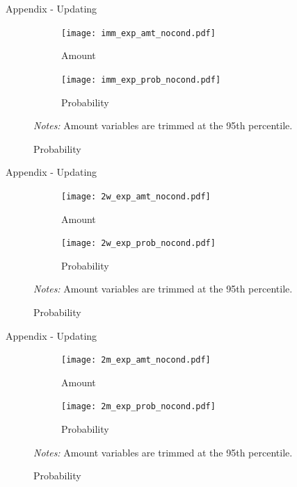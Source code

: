 \documentclass[8pt]{beamer}
\begin{document}
\begin{frame}{Appendix - Updating}
    \begin{figure}[H]
    \caption{Immediate updating}
    \label{update_expimm}
    \begin{center}
        \begin{subfigure}{0.45\textwidth}
            \caption{Amount}
            \centering
            \texttt{[image: imm\_exp\_amt\_nocond.pdf]}
        \end{subfigure}
        \begin{subfigure}{0.45\textwidth}
            \caption{Probability}
                \centering
                \texttt{[image: imm\_exp\_prob\_nocond.pdf]}
        \end{subfigure}
    \end{center} 
         \scriptsize \textit{Notes:} Amount variables are trimmed at the 95th percentile.
\end{figure}
\end{frame}

\begin{frame}{Appendix - Updating}
        \begin{figure}[H]
    \caption{Updating at 2 weeks}
    \label{update_exp2w}
    \begin{center}
        \begin{subfigure}{0.45\textwidth}
            \caption{Amount}
            \centering
            \texttt{[image: 2w\_exp\_amt\_nocond.pdf]}
        \end{subfigure}
        \begin{subfigure}{0.45\textwidth}
            \caption{Probability}
            \centering
            \texttt{[image: 2w\_exp\_prob\_nocond.pdf]}
        \end{subfigure}
      \end{center} 
         \scriptsize \textit{Notes:} Amount variables are trimmed at the 95th percentile.
\end{figure}      
        
\end{frame}


\begin{frame}{Appendix - Updating}
    \begin{figure}[H]
    \caption{Updating at 2 months}
    \label{update_exp2m}
    \begin{center}
            \begin{subfigure}{0.45\textwidth}
            \caption{Amount}
            \centering
            \texttt{[image: 2m\_exp\_amt\_nocond.pdf]}
        \end{subfigure}
        \begin{subfigure}{0.45\textwidth}
            \caption{Probability}
            \centering
            \texttt{[image: 2m\_exp\_prob\_nocond.pdf]}
        \end{subfigure}
    \end{center} 
         \scriptsize \textit{Notes:} Amount variables are trimmed at the 95th percentile.
\end{figure}

\end{frame}
\end{document}
